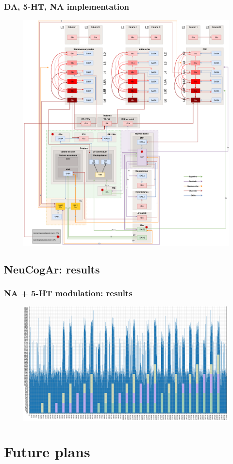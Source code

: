 \documentclass[12pt, aspectratio=169]{beamer}
\begin{document}
\begin{frame}
\frametitle{DA, 5-HT, NA implementation}
\begin{figure}
\includegraphics[width=0.5\linewidth]{DA_5-HT_NA_pathways}
\end{figure}
\end{frame}
\subsection{NeuCogAr: results}
\begin{frame}
\frametitle{NA + 5-HT modulation: results}
\begin{figure}
\includegraphics[width=0.9\linewidth]{cube_results.png}
\end{figure}
\end{frame}
\section{Future plans}
\end{document}
